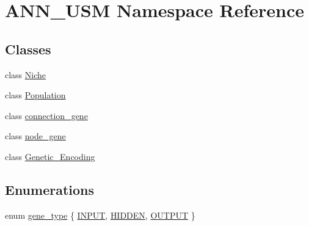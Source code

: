 \hypertarget{namespace_a_n_n___u_s_m}{\section{A\-N\-N\-\_\-\-U\-S\-M Namespace Reference}
\label{namespace_a_n_n___u_s_m}
}
\subsection*{Classes}
\begin{DoxyCompactItemize}
\item 
class \hyperlink{class_a_n_n___u_s_m_1_1_niche}{Niche}
\item 
class \hyperlink{class_a_n_n___u_s_m_1_1_population}{Population}
\item 
class \hyperlink{class_a_n_n___u_s_m_1_1connection__gene}{connection\-\_\-gene}
\item 
class \hyperlink{class_a_n_n___u_s_m_1_1node__gene}{node\-\_\-gene}
\item 
class \hyperlink{class_a_n_n___u_s_m_1_1_genetic___encoding}{Genetic\-\_\-\-Encoding}
\end{DoxyCompactItemize}
\subsection*{Enumerations}
\begin{DoxyCompactItemize}
\item 
enum \hyperlink{namespace_a_n_n___u_s_m_aa7f97f486244dd898592ba14dd7aa778}{gene\-\_\-type} \{ \hyperlink{namespace_a_n_n___u_s_m_aa7f97f486244dd898592ba14dd7aa778a7d1709e4616ab876261529547517bd3d}{I\-N\-P\-U\-T}, 
\hyperlink{namespace_a_n_n___u_s_m_aa7f97f486244dd898592ba14dd7aa778ac1f27e9ecf199fdd0f9c93c85c866e37}{H\-I\-D\-D\-E\-N}, 
\hyperlink{namespace_a_n_n___u_s_m_aa7f97f486244dd898592ba14dd7aa778aef5e3b43b7a6121b9cd2bce132cf07b7}{O\-U\-T\-P\-U\-T}
 \}
\end{DoxyCompactItemize}


